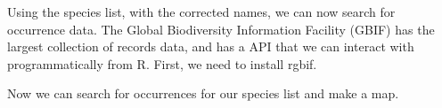Using the species list, with the corrected names, we can now search for occurrence data. The Global Biodiversity Information Facility (GBIF) has the largest collection of records data, and has a  API that we can interact with programmatically from R. First, we need to install rgbif.

\begin{knitrout}
\color{fgcolor}\begin{kframe}
\begin{alltt}
\hlstd{(}\hlstd{)}
\hlstd{(}\hlstd{,} \hlstd{)}
\end{alltt}
\end{kframe}
\end{knitrout}


Now we can search for occurrences for our species list and make a map.


